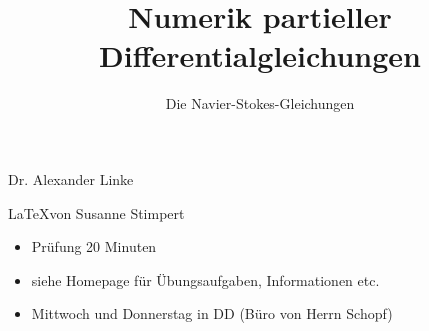 \documentclass[a4paper, fleqn]{scrartcl}
\title{Numerik partieller Differentialgleichungen}
\subtitle{Die Navier-Stokes-Gleichungen}
\begin{document}
\maketitle
\begin{center}
  Dr. Alexander Linke
  
\LaTeX von Susanne Stimpert
\end{center}

\begin{itemize}
\item Prüfung 20 Minuten
\item siehe Homepage für Übungsaufgaben, Informationen etc. 
\item Mittwoch und Donnerstag in DD (Büro von Herrn Schopf)
\end{itemize}



%
\end{document}
